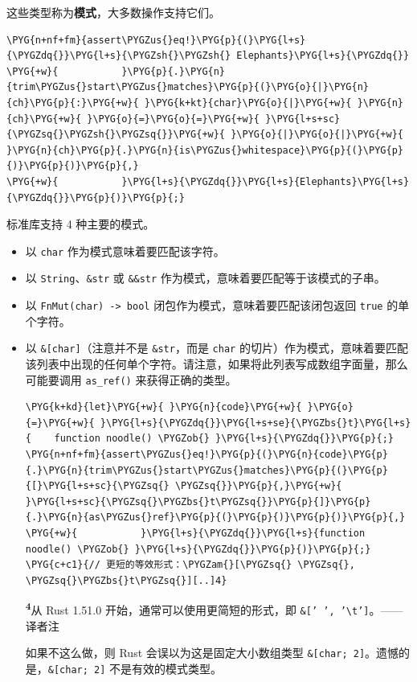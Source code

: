这些类型称为\textbf{模式}，大多数操作支持它们。

\begin{Verbatim}[commandchars=\\\{\},breaklines=true,breakanywhere=true,fontsize=\codefont,xleftmargin=17bp]
\PYG{n+nf+fm}{assert\PYGZus{}eq!}\PYG{p}{(}\PYG{l+s}{\PYGZdq{}}\PYG{l+s}{\PYGZsh{}\PYGZsh{} Elephants}\PYG{l+s}{\PYGZdq{}}
\PYG{+w}{           }\PYG{p}{.}\PYG{n}{trim\PYGZus{}start\PYGZus{}matches}\PYG{p}{(}\PYG{o}{|}\PYG{n}{ch}\PYG{p}{:}\PYG{+w}{ }\PYG{k+kt}{char}\PYG{o}{|}\PYG{+w}{ }\PYG{n}{ch}\PYG{+w}{ }\PYG{o}{=}\PYG{o}{=}\PYG{+w}{ }\PYG{l+s+sc}{\PYGZsq{}\PYGZsh{}\PYGZsq{}}\PYG{+w}{ }\PYG{o}{|}\PYG{o}{|}\PYG{+w}{ }\PYG{n}{ch}\PYG{p}{.}\PYG{n}{is\PYGZus{}whitespace}\PYG{p}{(}\PYG{p}{)}\PYG{p}{)}\PYG{p}{,}
\PYG{+w}{           }\PYG{l+s}{\PYGZdq{}}\PYG{l+s}{Elephants}\PYG{l+s}{\PYGZdq{}}\PYG{p}{)}\PYG{p}{;}
\end{Verbatim}

标准库支持 4 种主要的模式。

\begin{itemize}
\item 以 \texttt{char} 作为模式意味着要匹配该字符。
\item 以 \texttt{String}、\texttt{\&str} 或 \texttt{\&\&str} 作为模式，意味着要匹配等于该模式的子串。
\item 以 \texttt{FnMut(char) -> bool} 闭包作为模式，意味着要匹配该闭包返回 \texttt{true} 的单个字符。
\item 以 \texttt{\&[char]}（注意并不是 \texttt{\&str}，而是 \texttt{char} 的切片）作为模式，意味着要匹配该列表中出现的任何单个字符。请注意，如果将此列表写成数组字面量，那么可能要调用 \texttt{as\_ref()} 来获得正确的类型。

\begin{Verbatim}[commandchars=\\\{\},breaklines=true,breakanywhere=true,fontsize=\codefont,xleftmargin=17bp]
\PYG{k+kd}{let}\PYG{+w}{ }\PYG{n}{code}\PYG{+w}{ }\PYG{o}{=}\PYG{+w}{ }\PYG{l+s}{\PYGZdq{}}\PYG{l+s+se}{\PYGZbs{}t}\PYG{l+s}{    function noodle() \PYGZob{} }\PYG{l+s}{\PYGZdq{}}\PYG{p}{;}
\PYG{n+nf+fm}{assert\PYGZus{}eq!}\PYG{p}{(}\PYG{n}{code}\PYG{p}{.}\PYG{n}{trim\PYGZus{}start\PYGZus{}matches}\PYG{p}{(}\PYG{p}{[}\PYG{l+s+sc}{\PYGZsq{} \PYGZsq{}}\PYG{p}{,}\PYG{+w}{ }\PYG{l+s+sc}{\PYGZsq{}\PYGZbs{}t\PYGZsq{}}\PYG{p}{]}\PYG{p}{.}\PYG{n}{as\PYGZus{}ref}\PYG{p}{(}\PYG{p}{)}\PYG{p}{)}\PYG{p}{,}
\PYG{+w}{           }\PYG{l+s}{\PYGZdq{}}\PYG{l+s}{function noodle() \PYGZob{} }\PYG{l+s}{\PYGZdq{}}\PYG{p}{)}\PYG{p}{;}
\PYG{c+c1}{// 更短的等效形式：\PYGZam{}[\PYGZsq{} \PYGZsq{}, \PYGZsq{}\PYGZbs{}t\PYGZsq{}][..]4}
\end{Verbatim}

\begin{myNote}
\textsuperscript{\textbf{4}}从 Rust 1.51.0 开始，通常可以使用更简短的形式，即 \texttt{\&[' ', '\textbackslash{}t']}。——译者注
\end{myNote}

如果不这么做，则 Rust 会误以为这是固定大小数组类型 \texttt{\&[char; 2]}。遗憾的是，\texttt{\&[char; 2]} 不是有效的模式类型。
\end{itemize}

